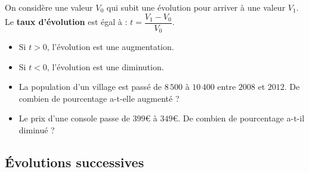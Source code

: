 \begin{Définition}
On considère une valeur $V_0$ qui subit une évolution pour arriver à une valeur $V_1$.\\
Le {\bf{taux d'évolution}} est égal à : $t=\dfrac{V_1-V_0}{V_0}$.
\end{Définition}

\begin{Remarque}
\leavevmode\vspace{-\baselineskip}
\begin{itemize}
\item Si $t>0$, l'évolution est une augmentation.
\item Si $t<0$, l'évolution est une diminution.
\end{itemize}
\end{Remarque}

\begin{Exemples}
\leavevmode\vspace{-\baselineskip}
\begin{itemize}
\item La population d'un village est passé de $8\,500$ à $10\,400$ entre $2008$ et $2012$. De combien de pourcentage a-t-elle augmenté ?

\ligne

\ligne

\ligne

\item Le prix d'une console passe de $399$€ à  $349$€. De combien de pourcentage a-t-il diminué ?

\ligne

\ligne

\ligne

\end{itemize}
\end{Exemples}

\newpage

\subsection{Évolutions successives}

